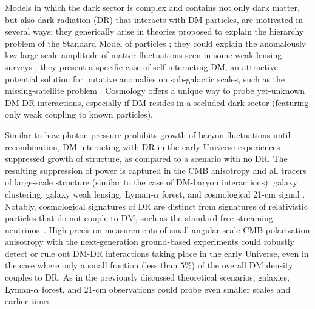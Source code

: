 \documentclass[12pt]{article}
\begin{document}
Models in which the dark sector is complex and contains not only dark matter, but also dark radiation (DR) that interacts with DM particles, are motivated in several ways: they generically arise in theories proposed to explain the hierarchy problem of the Standard Model of particles \cite{Arkani-Hamed:2016rle, Chacko:2018vss}; they could explain the anomalously low large-scale amplitude of matter fluctuations seen in some weak-lensing surveys \cite{Lesgourgues:2015wza,Chacko:2016kgg,Buen-Abad:2017gxg,Krall:2017xcw}; they present a specific case of self-interacting DM, an attractive potential solution for putative anomalies on sub-galactic scales, such as the missing-satellite problem \cite{Tulin:2012wi,Tulin:2013teo,Kaplinghat:2015aga,Bullock:2017xww}. 
Cosmology offers a unique way to probe yet-unknown DM-DR interactions, especially if DM resides in a secluded dark sector (featuring only weak coupling to known particles).

Similar to how photon pressure prohibits growth of baryon fluctuations until recombination, DM interacting with DR in the early Universe experiences suppressed growth of structure, as compared to a scenario with no DR. 
The resulting suppression of power is captured in the CMB anisotropy and all tracers of large-scale structure (similar to the case of DM-baryon interactions): galaxy clustering, galaxy weak lensing, Lyman-$\alpha$ forest, and cosmological 21-cm signal \cite{Boehm:2001hm,Cyr-Racine:2013fsa,Cyr-Racine:2015ihg}. 
Notably, cosmological signatures of DR are distinct from signatures of relativistic particles that do not couple to DM, such as the standard free-streaming neutrinos~\cite{Bashinsky:2003tk,Follin:2015hya,Baumann:2015rya}.
High-precision measurements of small-angular-scale CMB polarization anisotropy with the next-generation ground-based experiments could robustly detect or rule out DM-DR interactions taking place in the early Universe, even in the case where only a small fraction (less than $5\%$) of the overall DM density couples to DR. 
As in the previously discussed theoretical scenarios, galaxies, Lyman-$\alpha$ forest, and 21-cm observations could probe even smaller scales and earlier times. 

\vspace{-0.4cm}
\end{document}
